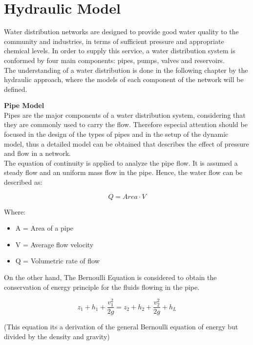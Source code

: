 \section{Hydraulic Model}

Water distribution networks are designed to provide good water quality to the community and industries, in 
terms of sufficient pressure and appropriate chemical levels. In order to supply this service, a water distribution 
system is conformed by four main components: pipes, pumps, valves and reservoirs. 
\\

The understanding of a water distribution is done in the following chapter by the hydraulic approach, 
where the models of each component of the network will be defined. 

\textbf{Pipe Model} \\ 
Pipes are the major components of a water distribution system, considering that they are commonly used to carry the flow. 
Therefore especial attention should be focused in the design of the types of pipes and in the setup of the dynamic model, 
thus a detailed model can be obtained that describes the effect of pressure and flow in a network. 
\\

The equation of continuity is applied to analyze the pipe flow. It is assumed a steady flow and an uniform 
mass flow in the pipe. Hence, the water flow can be described as: 

\begin{equation}
  Q=Area \cdot V
	\label{EquationOfContinuity}
\end{equation}

Where: 

\begin{itemize}
  \item  A = Area of a pipe
  \item V = Average flow velocity
  \item Q = Volumetric rate of flow
\end{itemize}


On the other hand, The Bernoulli Equation is considered to obtain the conservation of energy principle for the fluids flowing in the pipe.

\begin{equation}
z_1 + h_1 + \frac{v_1^{2}}{2g} = z_2 + h_2 + \frac{v_2^{2}}{2g} + h_L
\end{equation}

(This equation its a derivation of the general Bernoulli equation of energy but divided by the density and 
gravity)\\

